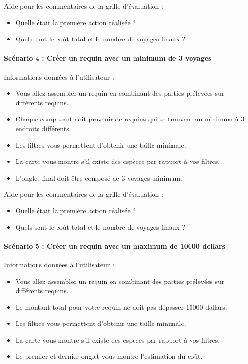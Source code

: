 \documentclass{article}
\begin{document}
Aide pour les commentaires de la grille d'évaluation :
\begin{itemize}
	\item Quelle était la première action réalisée ?
	\item Quels sont le coût total et le nombre de voyages finaux ?
\end{itemize}

\paragraph{Scénario 4 : Créer un requin avec un minimum de 3 voyages}

Informations données à l'utilisateur :
\begin{itemize}
	\item Vous allez assembler un requin en combinant des parties prélevées sur différents requins.
	\item Chaque composant doit provenir de requins qui se trouvent au minimum à 3 endroits différents.
	\item Les filtres vous permettent d'obtenir une taille minimale.
	\item La carte vous montre s'il existe des espèces par rapport à vos filtres.
	\item L'onglet final doit être composé de 3 voyages minimum.
\end{itemize}

Aide pour les commentaires de la grille d'évaluation :
\begin{itemize}
	\item Quelle était la première action réalisée ?
	\item Quels sont le coût total et le nombre de voyages finaux ?
\end{itemize}

\paragraph{Scénario 5 : Créer un requin avec un maximum de 10000 dollars}

Informations données à l'utilisateur :
\begin{itemize}
	\item Vous allez assembler un requin en combinant des parties prélevées sur différents requins.
	\item Le montant total pour votre requin ne doit pas dépasser 10000 dollars.
	\item Les filtres vous permettent d'obtenir une taille minimale.
	\item La carte vous montre s'il existe des espèces par rapport à vos filtres.
	\item Le premier et dernier onglet vous montre l'estimation du coût.
\end{itemize}
\end{document}
